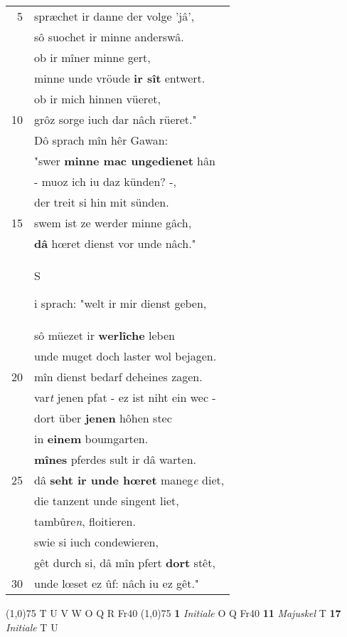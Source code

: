 \documentclass[8pt,a4paper,notitlepage]{article}
\begin{document}
\begin{table}[ht]
\begin{minipage}[t]{0.5\linewidth}
\begin{tabular}{rl}
5 & spræchet ir danne der volge 'jâ',\\ 
 & sô suochet ir minne anderswâ.\\ 
 & ob ir mîner minne gert,\\ 
 & minne unde vröude \textbf{ir sît} entwert.\\ 
 & ob ir mich hinnen vüeret,\\ 
10 & grôz sorge iuch dar nâch rüeret."\\ 
 & Dô sprach mîn hêr Gawan:\\ 
 & "swer \textbf{minne mac ungedienet} hân\\ 
 & - muoz ich iu daz künden? -,\\ 
 & der treit si hin mit sünden.\\ 
15 & swem ist ze werder minne gâch,\\ 
 & \textbf{dâ} hœret dienst vor unde nâch."\\ 
 & \begin{large}S\end{large}i sprach: "welt ir mir dienst geben,\\ 
 & sô müezet ir \textbf{werlîche} leben\\ 
 & unde muget doch laster wol bejagen.\\ 
20 & mîn dienst bedarf deheines zagen.\\ 
 & var\textit{t} jenen pfat - ez ist niht ein wec -\\ 
 & dort über \textbf{jenen} hôhen stec\\ 
 & in \textbf{einem} boumgarten.\\ 
 & \textbf{mînes} pferdes sult ir dâ warten.\\ 
25 & dâ \textbf{seht ir unde hœret} maneg\textit{e} diet,\\ 
 & die tanzent unde singent liet,\\ 
 & tambûre\textit{n}, floitieren.\\ 
 & swie si iuch condewieren,\\ 
 & gêt durch si, dâ mîn pfert \textbf{dort} stêt,\\ 
30 & unde lœset ez ûf: nâch iu ez gêt."\\ 
\end{tabular}
\scriptsize
\line(1,0){75} \newline
T U V W O Q R Fr40 \newline
\line(1,0){75} \newline
\textbf{1} \textit{Initiale} O Q Fr40  \textbf{11} \textit{Majuskel} T  \textbf{17} \textit{Initiale} T U  \newline

\end{minipage}
\end{table}
\end{document}
